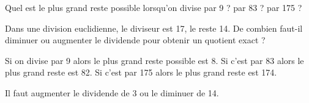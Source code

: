 \begin{myenumerate}
  \item Quel est le plus grand reste possible lorsqu'on divise par 9 ? par 83 ? par 175 ?
  \item Dans une division euclidienne, le diviseur est 17, le reste 14. De combien faut-il diminuer ou augmenter le dividende pour obtenir un quotient exact ?
\end{myenumerate}
\begin{myenumerate}
  \item Si on divise par 9 alors le plus grand reste possible est 8. Si c'est par 83 alors le plus grand reste est 82. Si c'est par 175 alors le plus grand reste est 174.
  \item Il faut augmenter le dividende de 3 ou le diminuer de 14.
\end{myenumerate}
